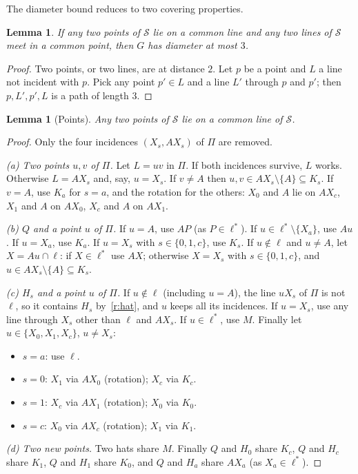 \documentclass[11pt]{amsart}
\newtheorem{lemma}[theorem]{Lemma}
\theoremstyle{remark}
\newcommand{\cS}{\mathcal{S}}
\begin{document}
The diameter bound reduces to two covering properties.

\begin{lemma}\label{lem:reduce}
If any two points of $\cS$ lie on a common line and any two lines of $\cS$ meet in a common point, then $G$ has diameter at most $3$.
\end{lemma}

\begin{proof}
Two points, or two lines, are at distance $2$. Let $p$ be a point and $L$ a line not incident with $p$. Pick any point $p' \in L$ and a line $L'$ through $p$ and $p'$; then $p, L', p', L$ is a path of length $3$.
\end{proof}

\begin{lemma}[Points]\label{lem:points}
Any two points of $\cS$ lie on a common line of $\cS$.
\end{lemma}

\begin{proof}
Only the four incidences $(X_s, AX_s)$ of $\Pi$ are removed.

\emph{(a) Two points $u, v$ of $\Pi$.} Let $L = uv$ in $\Pi$. If both incidences survive, $L$ works. Otherwise $L = AX_s$ and, say, $u = X_s$. If $v \neq A$ then $u, v \in AX_s \setminus \{A\} \subseteq K_s$. If $v = A$, use $K_a$ for $s = a$, and the rotation for the others: $X_0$ and $A$ lie on $AX_c$, $X_1$ and $A$ on $AX_0$, $X_c$ and $A$ on $AX_1$.

\emph{(b) $Q$ and a point $u$ of $\Pi$.} If $u = A$, use $AP$ (as $P \in \ell^*$). If $u \in \ell^* \setminus\{X_a\}$, use $Au$. If $u = X_a$, use $K_a$. If $u = X_s$ with $s \in \{0,1,c\}$, use $K_s$. If $u \notin \ell$ and $u \ne A$, let $X = Au \cap \ell$: if $X \in \ell^*$ use $AX$; otherwise $X = X_s$ with $s \in \{0,1,c\}$, and $u \in AX_s \setminus \{A\} \subseteq K_s$.

\emph{(c) $H_s$ and a point $u$ of $\Pi$.} If $u \notin \ell$ (including $u = A$), the line $uX_s$ of $\Pi$ is not $\ell$, so it contains $H_s$ by~\ref{r:hat}, and $u$ keeps all its incidences. If $u = X_s$, use any line through $X_s$ other than $\ell$ and $AX_s$. If $u \in \ell^*$, use $M$. Finally let $u \in \{X_0, X_1, X_c\}$, $u \ne X_s$:
\begin{itemize}[leftmargin=2em]
\item $s = a$: use $\ell$.
\item $s = 0$: $X_1$ via $AX_0$ (rotation); $X_c$ via $K_c$.
\item $s = 1$: $X_c$ via $AX_1$ (rotation); $X_0$ via $K_0$.
\item $s = c$: $X_0$ via $AX_c$ (rotation); $X_1$ via $K_1$.
\end{itemize}

\emph{(d) Two new points.} Two hats share $M$. Finally $Q$ and $H_0$ share $K_c$, $Q$ and $H_c$ share $K_1$, $Q$ and $H_1$ share $K_0$, and $Q$ and $H_a$ share $AX_a$ (as $X_a \in \ell^*$).
\end{proof}
\end{document}
